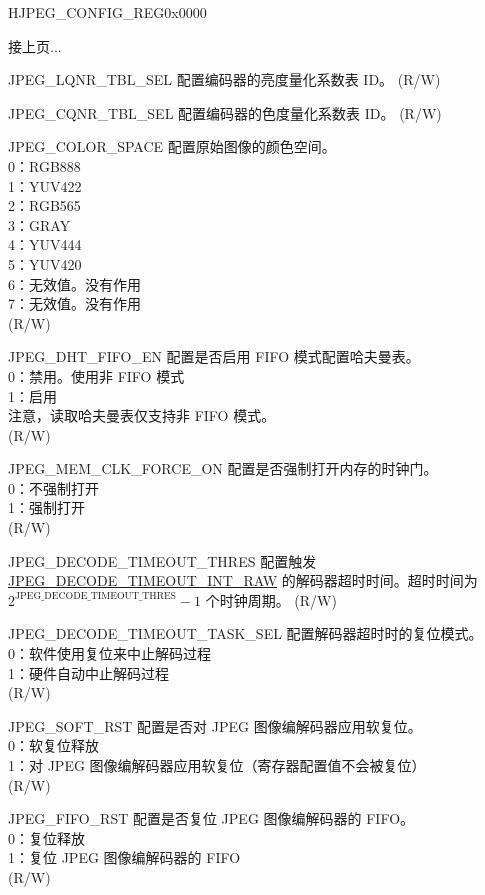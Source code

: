\addtocounter{Regfloat}{-1}
\begin{register}{H}{JPEG\_CONFIG\_REG}{0x0000}
\begin{regdesc}\begin{reglist}
\item [接上页...]

\label{fielddesc:JPEGLQNRTBLSEL}\item [JPEG\_LQNR\_TBL\_SEL] 配置编码器的亮度量化系数表 ID。 (R/W)
\label{fielddesc:JPEGCQNRTBLSEL}\item [JPEG\_CQNR\_TBL\_SEL] 配置编码器的色度量化系数表 ID。 (R/W)
\label{fielddesc:JPEGCOLORSPACE}\item [JPEG\_COLOR\_SPACE] 配置原始图像的颜色空间。\\
0：RGB888\\
1：YUV422\\
2：RGB565\\
3：GRAY\\
4：YUV444\\
5：YUV420\\
6：无效值。没有作用\\
7：无效值。没有作用\\
(R/W)
\label{fielddesc:JPEGDHTFIFOEN}\item [JPEG\_DHT\_FIFO\_EN] 配置是否启用 FIFO 模式配置哈夫曼表。\\
0：禁用。使用非 FIFO 模式\\
1：启用\\
注意，读取哈夫曼表仅支持非 FIFO 模式。\\
(R/W)
\label{fielddesc:JPEGMEMCLKFORCEON}\item [JPEG\_MEM\_CLK\_FORCE\_ON] 配置是否强制打开内存的时钟门。\\
0：不强制打开\\
1：强制打开\\
(R/W)
\label{fielddesc:JPEGDECODETIMEOUTTHRES}\item [JPEG\_DECODE\_TIMEOUT\_THRES] 配置触发 \hyperref[fielddesc:JPEGDECODETIMEOUTINTRAW]{JPEG\_DECODE\_TIMEOUT\_INT\_RAW} 的解码器超时时间。超时时间为 $2^{\mathrm{JPEG\_DECODE\_TIMEOUT\_THRES}} - 1$ 个时钟周期。 (R/W)
\label{fielddesc:JPEGDECODETIMEOUTTASKSEL}\item [JPEG\_DECODE\_TIMEOUT\_TASK\_SEL] 配置解码器超时时的复位模式。\\
0：软件使用复位来中止解码过程\\
1：硬件自动中止解码过程\\
(R/W)
\label{fielddesc:JPEGSOFTRST}\item [JPEG\_SOFT\_RST] 配置是否对 JPEG 图像编解码器应用软复位。\\
0：软复位释放\\
1：对 JPEG 图像编解码器应用软复位（寄存器配置值不会被复位）\\
(R/W)
\label{fielddesc:JPEGFIFORST}\item [JPEG\_FIFO\_RST] 配置是否复位 JPEG 图像编解码器的 FIFO。\\
0：复位释放\\
1：复位 JPEG 图像编解码器的 FIFO\\
(R/W)


\end{reglist}
\end{regdesc}
\end{register}
